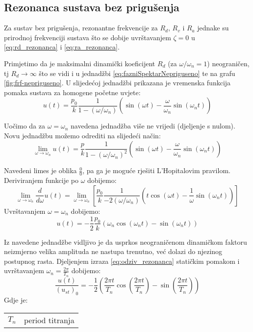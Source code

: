 \subsection{Rezonanca sustava bez prigušenja}
Za sustav bez prigušenja, rezonantne frekvencije za $R_d$, $R_v$ i $R_a$ jednake su
prirodnoj frekvenciji sustava što se dobije uvrštavanjem $\zeta = 0$ u \eqref{eq:rd_rezonanca} i 
\eqref{eq:ra_rezonanca}. 
\par

Primjetimo da je maksimalni dinamički koeficijent $R_d$ (za $\omega/\omega_n = 1$) 
neograničen, tj $R_d\to \infty$ što se vidi i u jednadžbi \eqref{eq:fazniSpektarNepriguseno} 
te na grafu \ref{fig:frf-nepriguseno}. U slijedećoj jednadžbi prikazana je vremenska 
funkcija pomaka sustava za homogene početne uvjete:
\begin{equation}
    u(t)=\frac{p_0}{k}\frac{1}{1-(\omega/\omega_n)}
            \left(\sin(\omega t) - \frac{\omega}{\omega_n}\sin(\omega_n t)\right)
\end{equation}

Uočimo da za $\omega = \omega_n$ navedena jednadžba više ne vrijedi (djeljenje s
nulom). Novu jednadžbu možemo odrediti na slijedeći način:
\begin{equation}\label{eq:limes}
    \lim_{\omega\to\omega_n}{u(t)} = 
        \frac{p}{k}\frac{1}{1-(\omega/\omega_n)^2}
            \left(\sin(\omega t) - \frac{\omega}{\omega_n}\sin(\omega_n t)\right)
\end{equation}

Navedeni limes je oblika $\frac{0}{0}$, pa ga je moguće rješiti L'Hopitalovim
pravilom. Deriviranjem funkcije po $\omega$ dobijemo:
\begin{equation}\label{eq:lhopitalovo_limes}
    \lim_{\omega\to\omega_n}\frac{d}{d\omega}u(t)=
    \lim_{\omega\to\omega_n} \left[
        \frac{p_0}{k}\frac{1}{-2(\omega/\omega_n)}
            \left(t\cos(\omega t) - \frac{1}{\omega}\sin(\omega_n t)\right)
           \right]
\end{equation}
Uvrštavanjem $\omega=\omega_n$ dobijemo:
\begin{equation}\label{eq:odziv_rezonanca}
    u(t)=-\frac{1}{2}\frac{p_0}{k}(\omega_n\cos(\omega_n t)-\sin(\omega_nt))
\end{equation}

Iz navedene jednadžbe vidljivo je da usprkos neograničenom dinamičkom faktoru
neizmjerno velika amplituda ne nastupa trenutno, već dolazi do njezinog 
postupnog rasta. Djeljenjem izraza \eqref{eq:odziv_rezonanca} statičkim pomakom i
uvrštavanjem $\omega_n=\frac{2\pi}{T_n}$ dobijemo:
\begin{equation}\label{eq:rezonanca_period}
    \frac{u(t)}{(u_{st})_0}=-\frac{1}{2}
        \left(\frac{2\pi t}{T_n}
                \cos\left(\frac{2\pi t}{T_n}\right)
                -
                \sin\left(\frac{2\pi t}{T_n}\right)
        \right)
\end{equation}
Gdje je:
\begin{table}[H]
    \begin{tabular} {r l}
        $T_n$ & period titranja\\
    \end{tabular}
\end{table}

